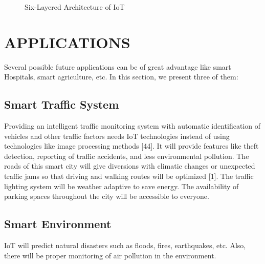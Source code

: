 \documentclass[twoside,twocolumn]{article}
\begin{document}
    \begin{figure}
        \centering
        \caption{Six-Layered Architecture of IoT}
    \end{figure}

\section{APPLICATIONS}
    Several possible future applications can be of great advantage like smart Hospitals, smart agriculture, etc. In this section, we present three of them:
    \subsection{Smart Traffic System}
        Providing an intelligent traffic monitoring system with automatic identification of vehicles and other traffic factors needs IoT technologies instead of using technologies like image processing methods [44]. It will provide features like theft detection, reporting of traffic accidents, and less environmental pollution. The roads of this smart city will give diversions with climatic changes or unexpected traffic jams so that driving and walking routes will be optimized [1]. The traffic lighting system will be weather adaptive to save energy. The availability of parking spaces throughout the city will be accessible to everyone.
    \subsection{Smart Environment}
        IoT will predict natural disasters such as floods, fires, earthquakes, etc. Also, there will be proper monitoring of air pollution in the environment.
\end{document}
